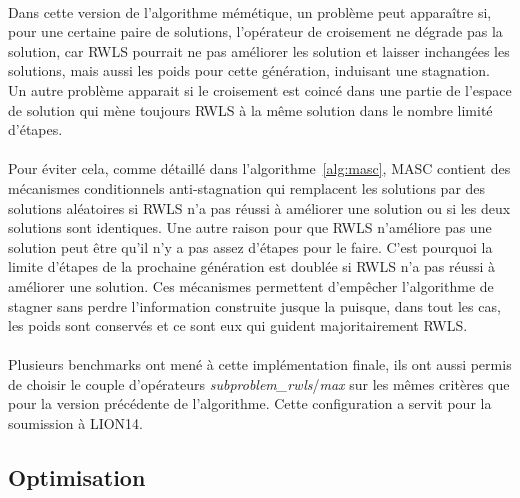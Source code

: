 \documentclass[a4paper,11pt,twoside,french,report]{../common/simplem}
\begin{document}
				\paragraph*{}
					Dans cette version de l'algorithme mémétique, un problème peut apparaître si, pour une certaine paire de solutions, l'opérateur de croisement ne dégrade pas la solution, car \gls{RWLS} pourrait ne pas améliorer les solution et laisser inchangées les solutions, mais aussi les poids pour cette génération, induisant une stagnation. Un autre problème apparait si le croisement est coincé dans une partie de l'espace de solution qui mène toujours \gls{RWLS} à la même solution dans le nombre limité d'étapes.
				\paragraph*{}
					Pour éviter cela, comme détaillé dans l'algorithme~\ref{alg:masc}, \gls{MASC} contient des mécanismes conditionnels anti-stagnation qui remplacent les solutions par des solutions aléatoires si \gls{RWLS} n'a pas réussi à améliorer une solution ou si les deux solutions sont identiques. Une autre raison pour que \gls{RWLS} n'améliore pas une solution peut être qu'il n'y a pas assez d'étapes pour le faire. C'est pourquoi la limite d'étapes de la prochaine génération est doublée si \gls{RWLS} n'a pas réussi à améliorer une solution. Ces mécanismes permettent d'empêcher l'algorithme de stagner sans perdre l'information construite jusque la puisque, dans tout les cas, les poids sont conservés et ce sont eux qui guident majoritairement \gls{RWLS}.
				\paragraph*{}
					
				\paragraph*{}
					Plusieurs benchmarks ont mené à cette implémentation finale, ils ont aussi permis de choisir le couple d'opérateurs \textit{subproblem\_rwls}/\textit{max} sur les mêmes critères que pour la version précédente de l'algorithme. Cette configuration a servit pour la soumission à \acrshort{LION14}.
			\subsection{Optimisation}
\end{document}
